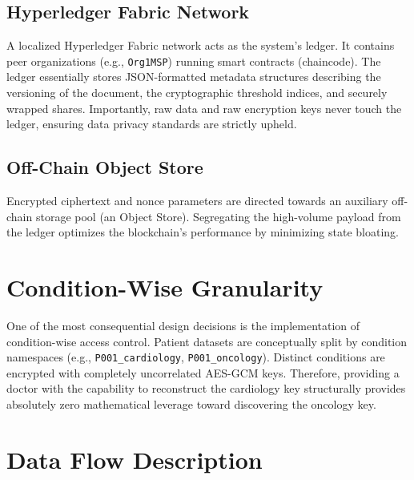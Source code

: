 \subsection{Hyperledger Fabric Network}
A localized Hyperledger Fabric network acts as the system's ledger. It contains peer organizations (e.g., \texttt{Org1MSP}) running smart contracts (chaincode). The ledger essentially stores JSON-formatted metadata structures describing the versioning of the document, the cryptographic threshold indices, and securely wrapped shares. Importantly, raw data and raw encryption keys never touch the ledger, ensuring data privacy standards are strictly upheld.

\subsection{Off-Chain Object Store}
Encrypted ciphertext and nonce parameters are directed towards an auxiliary off-chain storage pool (an Object Store). Segregating the high-volume payload from the ledger optimizes the blockchain's performance by minimizing state bloating.

\section{Condition-Wise Granularity}
One of the most consequential design decisions is the implementation of condition-wise access control. Patient datasets are conceptually split by condition namespaces (e.g., \texttt{P001\_cardiology}, \texttt{P001\_oncology}). Distinct conditions are encrypted with completely uncorrelated AES-GCM keys. Therefore, providing a doctor with the capability to reconstruct the cardiology key structurally provides absolutely zero mathematical leverage toward discovering the oncology key.

\section{Data Flow Description}

